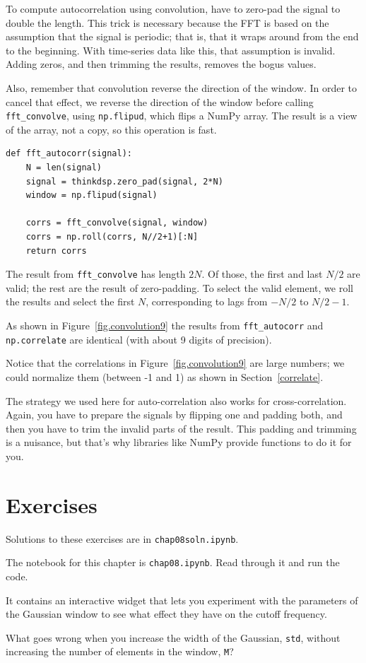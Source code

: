 \documentclass[12pt]{book}
\begin{document}
To compute autocorrelation using convolution, 
have to zero-pad the signal to double the length. 
This trick is necessary because the FFT is based
on the assumption that the signal is periodic; that is, that it wraps
around from the end to the beginning.  With time-series data like
this, that assumption is invalid.  Adding zeros, and then trimming 
the results, removes the bogus values.

Also, remember that convolution reverse the direction of the window.
In order to cancel that effect, we reverse the direction of the
window before calling \verb"fft_convolve", using {\tt np.flipud},
which flips a NumPy array.  The result is a view of the array,
not a copy, so this operation is fast.

\begin{verbatim}
def fft_autocorr(signal):
    N = len(signal)
    signal = thinkdsp.zero_pad(signal, 2*N)
    window = np.flipud(signal)

    corrs = fft_convolve(signal, window)
    corrs = np.roll(corrs, N//2+1)[:N]
    return corrs
\end{verbatim}

The result from \verb"fft_convolve" has length $2N$.  Of those,
the first and last $N/2$ are valid; the rest are the result of
zero-padding.  To select the valid element, we roll the results
and select the first $N$, corresponding to lags from $-N/2$ to
$N/2-1$.

As shown in Figure~\ref{fig.convolution9} the results from
\verb"fft_autocorr" and {\tt np.correlate} are identical (with
about 9 digits of precision).

Notice that the correlations in Figure~\ref{fig.convolution9} are
large numbers; we could normalize them (between -1 and 1) as shown
in Section~\ref{correlate}.

The strategy we used here for auto-correlation also works for
cross-correlation.  Again, you have to prepare the signals by flipping
one and padding both, and then you have to trim the invalid parts of
the result.  This padding and trimming is a nuisance, but that's why
libraries like NumPy provide functions to do it for you.


\section{Exercises}

Solutions to these exercises are in {\tt chap08soln.ipynb}.

\begin{exercise}
The notebook for this chapter is {\tt chap08.ipynb}.
Read through it and run the code.

It contains an interactive widget that lets you
experiment with the parameters of the Gaussian window to see
what effect they have on the cutoff frequency.

What goes wrong when you increase the width of the Gaussian,
{\tt std}, without increasing the number of elements in the window,
{\tt M}?
\end{exercise}
\end{document}
